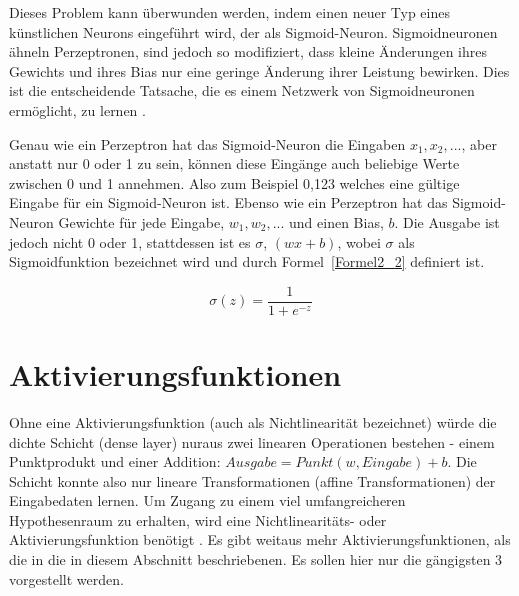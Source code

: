 Dieses Problem kann überwunden werden, indem einen neuer Typ eines künstlichen Neurons eingeführt wird, der als Sigmoid-Neuron. Sigmoidneuronen ähneln Perzeptronen, sind jedoch so modifiziert, dass kleine Änderungen ihres Gewichts und ihres Bias nur eine geringe Änderung ihrer Leistung bewirken. Dies ist die entscheidende Tatsache, die es einem Netzwerk von Sigmoidneuronen ermöglicht, zu lernen \cite*[S. 8]{Nielsen}.

Genau wie ein Perzeptron hat das Sigmoid-Neuron die Eingaben $x_1, x_2, ...$, aber anstatt nur 0 oder 1 zu sein, können diese Eingänge auch beliebige Werte zwischen 0 und 1 annehmen. Also zum Beispiel 0,123 welches eine gültige Eingabe für ein Sigmoid-Neuron ist. Ebenso wie ein Perzeptron hat das Sigmoid-Neuron Gewichte für jede Eingabe, $w_1, w_2, ...$ und einen Bias, $b$. Die Ausgabe ist jedoch nicht 0 oder 1, stattdessen ist es $\sigma$, $(wx + b)$, wobei $\sigma$ als Sigmoidfunktion bezeichnet wird und durch Formel~\ref{Formel2_2} definiert ist.

\begin{equation} \label{Formel2_2}
  \sigma (z) = \frac{1}{1+e^{-z}}
\end{equation}


\section{Aktivierungsfunktionen}
Ohne eine Aktivierungsfunktion (auch als Nichtlinearität bezeichnet) würde die dichte Schicht (dense layer) nuraus zwei linearen Operationen bestehen - einem Punktprodukt und einer Addition: $Ausgabe = Punkt (w, Eingabe) + b$. Die Schicht konnte also nur lineare Transformationen (affine Transformationen) der Eingabedaten lernen. Um Zugang zu einem viel umfangreicheren Hypothesenraum zu erhalten, wird eine Nichtlinearitäts- oder Aktivierungsfunktion benötigt \cite*[S. 72]{Chollet2017}. Es gibt weitaus mehr Aktivierungsfunktionen, als die in die in diesem Abschnitt beschriebenen. Es sollen hier nur die gängigsten 3 vorgestellt werden.

